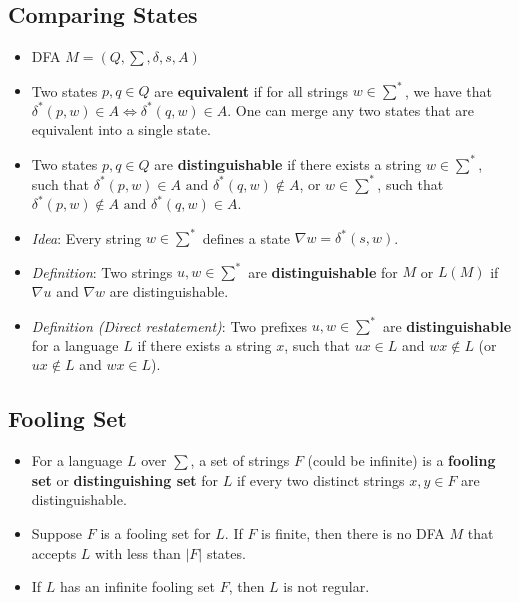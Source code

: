 \documentclass[12pt]{article}
\begin{document}
\subsection{Comparing States}
\begin{itemize}
    \item DFA $M = (Q, \sum, \delta, s, A)$
    \item Two states $p,q \in Q$ are \textbf{equivalent} if for all strings $w \in \sum^{\ast}$, we have that $\delta^{\ast}(p, w) \in A \iff \delta^{\ast}(q, w) \in A$. One can merge any two states that are equivalent into a single state.
    \item Two states $p,q \in Q$ are \textbf{distinguishable} if there exists a string $w \in \sum^{\ast}$, such that $\delta^{\ast}(p, w) \in A \text{ and } \delta^{\ast}(q, w) \notin A$, or $w \in \sum^{\ast}$, such that $\delta^{\ast}(p, w) \notin A \text{ and } \delta^{\ast}(q, w) \in A$.
    \item \textit{Idea}: Every string $w \in \sum^{\ast}$ defines a state $\nabla w = \delta^{\ast}(s,w)$.
    \item \textit{Definition}: Two strings $u, w \in \sum^{\ast}$ are \textbf{distinguishable} for $M$ or $L(M)$ if $\nabla u$ and $\nabla w$ are distinguishable.
    \item \textit{Definition (Direct restatement)}: Two prefixes $u, w \in \sum^{\ast}$ are \textbf{distinguishable} for a language $L$ if there exists a string $x$, such that $ux \in L$ and $wx \notin L$ (or $ux \notin L$ and $wx \in L$).
\end{itemize}

\subsection{Fooling Set}
\begin{itemize}
    \item For a language $L$ over $\sum$, a set of strings $F$ (could be infinite) is a \textbf{fooling set} or \textbf{distinguishing set} for $L$ if every two distinct strings $x, y \in F$ are distinguishable.
    \item Suppose $F$ is a fooling set for $L$. If $F$ is finite, then there is no DFA $M$ that accepts $L$ with less than $\left|{F}\right|$ states.
    \item If $L$ has an infinite fooling set $F$, then $L$ is not regular.
\end{itemize}
\end{document}

